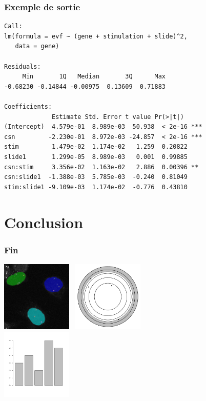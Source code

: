 \documentclass{beamer}
\begin{document}
\begin{frame}[fragile] 
\frametitle{Exemple de sortie} 
\small \begin{verbatim} 
Call:
lm(formula = evf ~ (gene + stimulation + slide)^2,
   data = gene)

Residuals:
     Min       1Q   Median       3Q      Max 
-0.68230 -0.14844 -0.00975  0.13609  0.71883 

Coefficients:
             Estimate Std. Error t value Pr(>|t|)    
(Intercept)  4.579e-01  8.989e-03  50.938  < 2e-16 ***
csn         -2.230e-01  8.972e-03 -24.857  < 2e-16 ***
stim         1.479e-02  1.174e-02   1.259  0.20822    
slide1       1.299e-05  8.989e-03   0.001  0.99885    
csn:stim     3.356e-02  1.163e-02   2.886  0.00396 ** 
csn:slide1  -1.388e-03  5.785e-03  -0.240  0.81049    
stim:slide1 -9.109e-03  1.174e-02  -0.776  0.43810    
\end{verbatim} \normalsize
\end{frame} 
  
\section*{Conclusion}

  \frame
  {
    \frametitle{Fin}
    \begin{center}
      \includegraphics[height=3.37cm]{cas-overlay.png}~
      \includegraphics[height=3.37cm]{expose_12062007-008.pdf} \\
      \includegraphics[height=3.37cm]{expose_12062007-009.pdf}~
    \end{center}
  }
  
\end{document}

